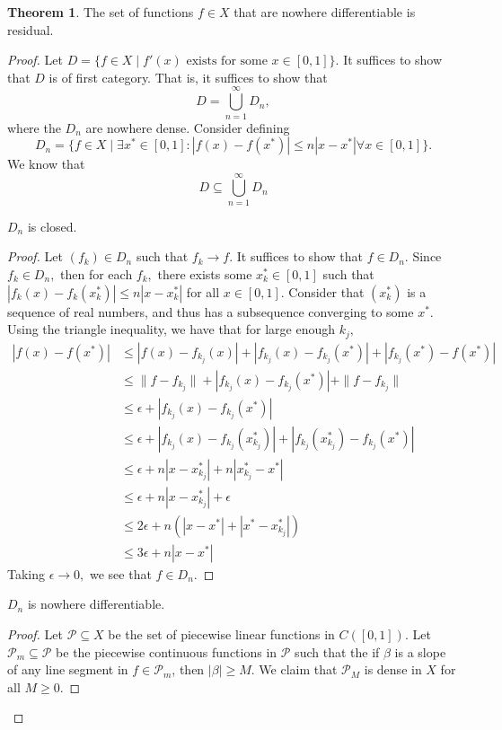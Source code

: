 \documentclass[10pt, oneside]{article}
\theoremstyle{definition}
\newtheorem{thm}{Theorem}
\begin{document}
\begin{thm}
    The set of functions $f \in X$ that are nowhere differentiable is residual.
\end{thm}
\begin{proof}
    Let $D= \{f \in X \mid f'(x) \text{ exists for some }x\in [0,1]\}.$ It suffices to show that $D$ is of first category. That is, it suffices to show that 
    \[D = \bigcup_{n=1}^\infty D_n,\] where the $D_n$ are nowhere dense. Consider defining 
    \[D_n = \{f\in X \mid \exists x^* \in [0,1] : |f(x) - f(x^*)| \leq n|x-x^*|\forall x\in [0,1] \}.\] We know that 
    \[D \subseteq \bigcup_{n=1}^\infty D_n\]
\begin{lemma}
    $D_n$ is closed.
\end{lemma}
\begin{proof}
    Let $(f_k) \in D_n$ such that $f_k \to f.$ It suffices to show that $f\in D_n.$ Since $f_k \in D_n,$ then for each $f_k,$ there exists some $x^*_k \in [0,1]$ such that $|f_k(x) - f_k(x^*_k)| \leq n|x - x^*_k|$ for all $x\in [0,1].$ Consider that $(x^*_k)$ is a sequence of real numbers, and thus has a subsequence converging to some $x^*$.
    Using the triangle inequality, we have that for large enough $k_j,$ 
    \begin{align*}
|f(x) - f(x^*)| &\leq |f(x) - f_{k_j}(x)| + |f_{k_j}(x) - f_{k_j}(x^*)| + |f_{k_j}(x^*) - f(x^*)|    \\
&\leq \|f - f_{k_j}\| + |f_{k_j}(x) - f_{k_j}(x^*)| + \|f- f_{k_j}\|\\
&\leq \epsilon + |f_{k_j}(x) - f_{k_j}(x^*)|\\
&\leq \epsilon + |f_{k_j}(x) - f_{k_j}(x^*_{k_j})| + |f_{k_j}(x_{k_j}^*) - f_{k_j}(x^*)|\\
&\leq \epsilon + n|x - x_{k_j}^*| + n|x_{k_j}^* - x^*|\\
&\leq \epsilon + n|x - x_{k_j}^*| + \epsilon\\
&\leq 2\epsilon + n(|x-x^*| + |x^* - x_{k_j}^*|)\\
&\leq 3\epsilon + n|x - x^*|
    \end{align*}
    Taking $\epsilon \to 0,$ we see that $f\in D_n.$ 
\end{proof}
\begin{lemma}
    $D_n$ is nowhere differentiable.
\end{lemma}
\begin{proof}
    Let $\mathcal{P}\subseteq X$ be the set of piecewise linear functions in $C([0,1]).$ Let $\mathcal{P}_m\subseteq \mathcal{P}$ be the piecewise continuous functions in $\mathcal{P}$ such that the if $\beta$ is a slope of any line segment in $f \in \mathcal{P}_m$, then $|\beta|\geq M.$ We claim that $\mathcal{P}_M$ is dense in $X$ for all $M \geq 0.$
\end{proof}

\end{proof}
\end{document}
